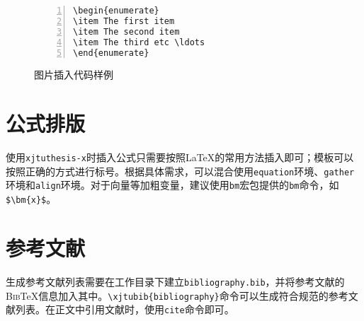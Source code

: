 \begin{figure}[h]
  {
  \fontsize{10pt}{12pt}\selectfont
  \setmainfont{Courier New}
  \begin{lstlisting}[showstringspaces=false,numbers=left,xleftmargin=3em]
\begin{enumerate}
\item The first item
\item The second item
\item The third etc \ldots
\end{enumerate}

  \end{lstlisting}
  }
\caption{图片插入代码样例}
\label{fig:fig_code}
\end{figure}

\section{公式排版}
使用\texttt{xjtuthesis-x}时插入公式只需要按照\LaTeX 的常用方法插入即可；模板可以按照正确的方式进行标号。根据具体需求，可以混合使用\texttt{equation}环境、\texttt{gather}环境和\texttt{align}环境。对于向量等加粗变量，建议使用\texttt{bm}宏包提供的\texttt{bm}命令，如\verb|$\bm{x}$|。

\section{参考文献}
生成参考文献列表需要在工作目录下建立\texttt{bibliography.bib}，并将参考文献的\textsc{Bib}\TeX 信息加入其中。\verb|\xjtubib{bibliography}|命令可以生成符合规范的参考文献列表。在正文中引用文献时，使用\verb|cite|命令即可。
